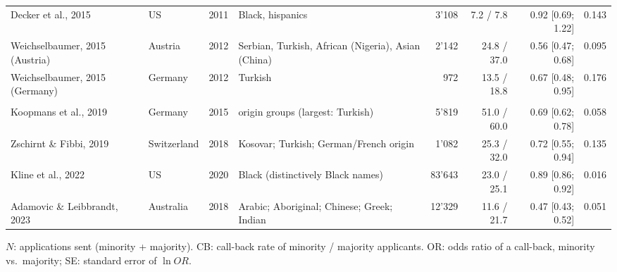 {\begin{longtable}{>{\raggedright\arraybackslash}p{3.4cm}lr>{\raggedright\arraybackslash}p{3.2cm}rrrr}
Decker et al., 2015 & US & 2011 & Black, hispanics & 3'108 & 7.2 / 7.8 & 0.92 [0.69; 1.22] & 0.143 \\
Weichselbaumer, 2015 (Austria) & Austria & 2012 & Serbian, Turkish, African (Nigeria), Asian (China) & 2'142 & 24.8 / 37.0 & 0.56 [0.47; 0.68] & 0.095 \\
Weichselbaumer, 2015 (Germany) & Germany & 2012 & Turkish & 972 & 13.5 / 18.8 & 0.67 [0.48; 0.95] & 0.176 \\
\midrule \multicolumn{8}{l}{\textit{New studies (update)}}\\ \midrule
Koopmans et al., 2019 & Germany & 2015 & 34 origin groups (largest: Turkish) & 5'819 & 51.0 / 60.0 & 0.69 [0.62; 0.78] & 0.058 \\
Zschirnt \& Fibbi, 2019 & Switzerland & 2018 & Kosovar; Turkish; German/French origin & 1'082 & 25.3 / 32.0 & 0.72 [0.55; 0.94] & 0.135 \\
Kline et al., 2022 & US & 2020 & Black (distinctively Black names) & 83'643 & 23.0 / 25.1 & 0.89 [0.86; 0.92] & 0.016 \\
Adamovic \& Leibbrandt, 2023 & Australia & 2018 & Arabic; Aboriginal; Chinese; Greek; Indian & 12'329 & 11.6 / 21.7 & 0.47 [0.43; 0.52] & 0.051 \\
\end{longtable}
\par\footnotesize $N$: applications sent (minority + majority). CB: call-back rate of minority / majority applicants. OR: odds ratio of a call-back, minority vs.\ majority; SE: standard error of $\ln OR$.
}
